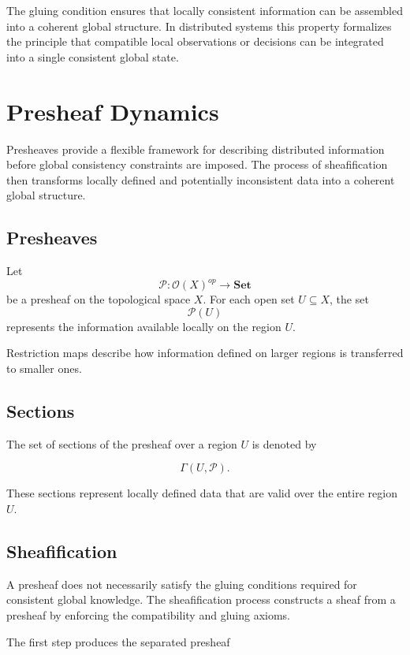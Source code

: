 \documentclass[12pt]{article}
\begin{document}
The gluing condition ensures that locally consistent information can be assembled into a coherent global structure. In distributed systems this property formalizes the principle that compatible local observations or decisions can be integrated into a single consistent global state.

\section{Presheaf Dynamics}

Presheaves provide a flexible framework for describing distributed information before global consistency constraints are imposed. The process of sheafification then transforms locally defined and potentially inconsistent data into a coherent global structure.

\subsection{Presheaves}

Let
\[
\mathcal{P} : \mathcal{O}(X)^{op} \rightarrow \mathbf{Set}
\]
be a presheaf on the topological space $X$. For each open set $U \subseteq X$, the set
\[
\mathcal{P}(U)
\]
represents the information available locally on the region $U$.

Restriction maps describe how information defined on larger regions is transferred to smaller ones.

\subsection{Sections}

The set of sections of the presheaf over a region $U$ is denoted by

\[
\Gamma(U,\mathcal{P}).
\]

These sections represent locally defined data that are valid over the entire region $U$.

\subsection{Sheafification}

A presheaf does not necessarily satisfy the gluing conditions required for consistent global knowledge. The sheafification process constructs a sheaf from a presheaf by enforcing the compatibility and gluing axioms.

The first step produces the separated presheaf
\end{document}

